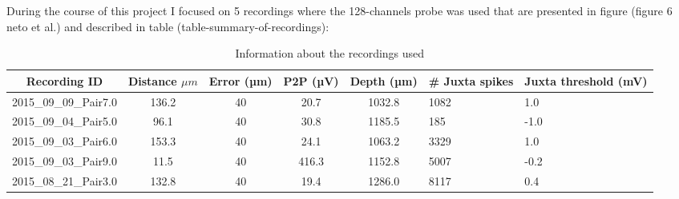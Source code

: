 \documentclass{report}
\begin{document}
During the course of this project I focused on 5 recordings where the 128-channels probe was used that are presented in figure (figure 6 neto et al.) and described in table (table-summary-of-recordings):
\begin{table}[t]
\centering
\begin{tabular}{|c|c|c|c|c|p{1cm}|p{1cm}|}
\hline
\textbf{Recording ID} & \textbf{Distance \(\mu m\)} & \textbf{Error (µm)} & \textbf{P2P (µV)} & \textbf{Depth (µm)} & \textbf{\# Juxta spikes} & \textbf{Juxta threshold (mV)} \\ \hline
2015\_09\_09\_Pair7.0 & 136.2 & 40 & 20.7 & 1032.8 & 1082 & 1.0 \\ \hline
2015\_09\_04\_Pair5.0 & 96.1 & 40 & 30.8 & 1185.5 & 185 & -1.0 \\ \hline
2015\_09\_03\_Pair6.0 & 153.3 & 40 & 24.1 & 1063.2 & 3329 & 1.0 \\ \hline
2015\_09\_03\_Pair9.0 & 11.5 & 40 & 416.3 & 1152.8 & 5007 & -0.2 \\ \hline
2015\_08\_21\_Pair3.0 & 132.8 & 40 & 19.4 & 1286.0 & 8117 & 0.4 \\ \hline
\end{tabular}
\caption{Information about the recordings used}
\label{tab:sum_recordings}
\end{table}
\end{document}
